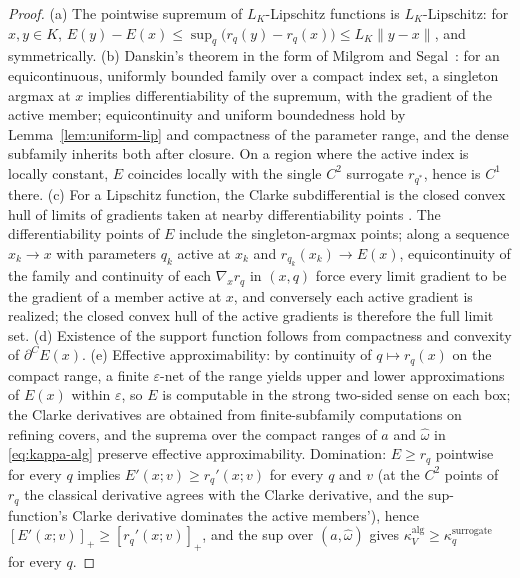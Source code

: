 \documentclass[11pt,a4paper]{article}
\theoremstyle{plain}
\theoremstyle{definition}
\theoremstyle{remark}
\newcommand{\kk}{\kappa_{\!V}}
\begin{document}
\begin{proof}
(a) The pointwise supremum of $L_K$-Lipschitz functions is
$L_K$-Lipschitz: for $x, y \in K$,
$E(y) - E(x) \le \sup_q\bigl(r_q(y) - r_q(x)\bigr) \le L_K\|y - x\|$,
and symmetrically. (b) Danskin's theorem in the form of Milgrom
and Segal~\citep{milgromsegal2002}: for an equicontinuous, uniformly
bounded family over a
compact index set, a singleton argmax at $x$ implies
differentiability of the supremum, with the gradient of the active
member; equicontinuity and uniform boundedness hold by
Lemma~\ref{lem:uniform-lip} and compactness of the parameter range,
and the dense subfamily inherits both after closure. On a region
where the active index is locally constant, $E$ coincides locally
with the single $C^2$ surrogate $r_{q^*}$, hence is $C^1$ there.
(c) For a Lipschitz function, the Clarke subdifferential is the
closed convex hull of limits of gradients taken at nearby
differentiability points \citep[Theorem~2.5.1]{clarke1990}. The
differentiability points of $E$ include the singleton-argmax points;
along a sequence $x_k \to x$ with parameters $q_k$ active at $x_k$
and $r_{q_k}(x_k) \to E(x)$, equicontinuity of the family and
continuity of each $\nabla_x r_q$ in $(x, q)$ force every limit
gradient to be the gradient of a member active at $x$, and
conversely each active gradient is realized; the closed convex hull
of the active gradients is therefore the full limit set. (d)
Existence of the support function follows from compactness and
convexity of $\partial^{C}E(x)$. (e) Effective approximability: by
continuity of $q \mapsto r_q(x)$ on the compact range, a finite
$\varepsilon$-net of the range yields upper and lower approximations
of $E(x)$ within $\varepsilon$, so $E$ is computable in the strong
two-sided sense on each box; the Clarke derivatives are obtained
from finite-subfamily computations on refining covers, and the
suprema over the compact ranges of $a$ and $\hat\omega$ in
\eqref{eq:kappa-alg} preserve effective approximability. Domination:
$E \ge r_q$ pointwise for every $q$ implies $E'(x; v) \ge
r_q'(x; v)$ for every $q$ and $v$ (at the $C^2$ points of $r_q$ the
classical derivative agrees with the Clarke derivative, and the
sup-function's Clarke derivative dominates the active members'),
hence $[E'(x; v)]_+ \ge [r_q'(x; v)]_+$, and the sup over
$(a, \hat\omega)$ gives
$\kk^{\mathrm{alg}} \ge \kappa^{\mathrm{surrogate}}_q$ for every $q$.
\end{proof}
\end{document}
